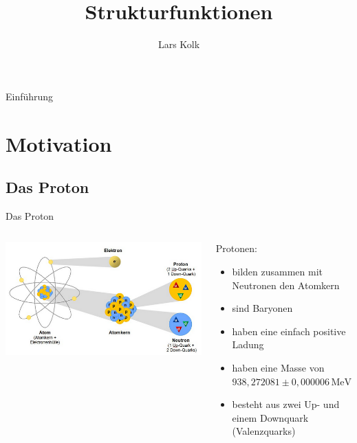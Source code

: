 \documentclass[aspectratio=1610, 9pt]{beamer}
\title{Strukturfunktionen}
\author[L.~Kolk]{Lars Kolk}
\institute[Fakultät Physik]{Fakultät Physik}
\begin{document}
\maketitle


\begin{frame}{Einführung}
  \tableofcontents
\end{frame}

\section{Motivation}
\subsection{Das Proton}
\begin{frame}{Das Proton}
\begin{columns}
\begin{column}{0.40\textwidth}
  \includegraphics[width = \textwidth]{images/atom.png}
\end{column}
\begin{column}{0.60\textwidth}
    Protonen:
    \begin{itemize}
      \item{bilden zusammen mit Neutronen den Atomkern}
      \item{sind Baryonen}
      \item{haben eine einfach positive Ladung}
      \item{haben eine Masse von $938,272081 \pm 0,000006 \,\mathrm{MeV}$ }
      \item{besteht aus zwei Up- und einem Downquark (Valenzquarks)}
    \end{itemize}
\end{column}
\end{columns}
\end{frame}
\end{document}
